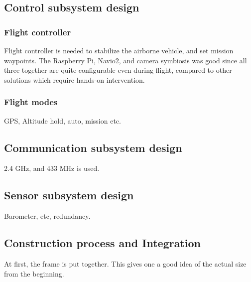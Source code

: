 \subsection{Control subsystem design}

\subsubsection{Flight controller}
Flight controller is needed to stabilize the airborne vehicle, and set mission waypoints. The Raspberry Pi, Navio2, and camera symbiosis was good since all three together are quite configurable even during flight, compared to other solutions which require hands-on intervention.

\subsubsection{Flight modes}

GPS, Altitude hold, auto, mission etc.

\subsection{Communication subsystem design}

2.4 GHz, and 433 MHz is used.

\subsection{Sensor subsystem design}

Barometer, etc, redundancy.

\subsection{Construction process and Integration}

At first, the frame is put together. This gives one a good idea of the actual size from the beginning.

